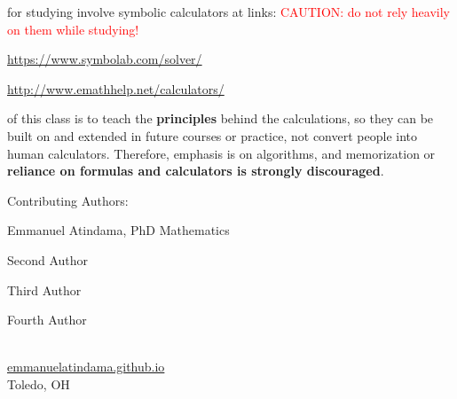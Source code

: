 \begin{fullwidth}
 for studying involve symbolic calculators at links:
\textcolor{red}{CAUTION: do not rely heavily on them while studying!}
\begin{compactitem}
    \item \url{https://www.symbolab.com/solver/}
    \item \url{http://www.emathhelp.net/calculators/}
\end{compactitem}

 of this class is to teach the \textbf{principles} behind the calculations, so they can be built on and extended in future courses or practice, not convert people into human calculators. Therefore, emphasis is on algorithms, and memorization or \textbf{reliance on formulas and calculators is strongly discouraged}.

Contributing Authors:
\begin{colenumerate}
    \item Emmanuel Atindama, PhD Mathematics
    \item Second Author
    \item Third Author
    \item Fourth Author
\end{colenumerate}

\begin{flushright}
 \\
\href{mailto:emmanuel.atindama@utoledo.edu}{emmanuelatindama.github.io} \\
Toledo, OH \\
\monthyear
\end{flushright}

\end{fullwidth}
